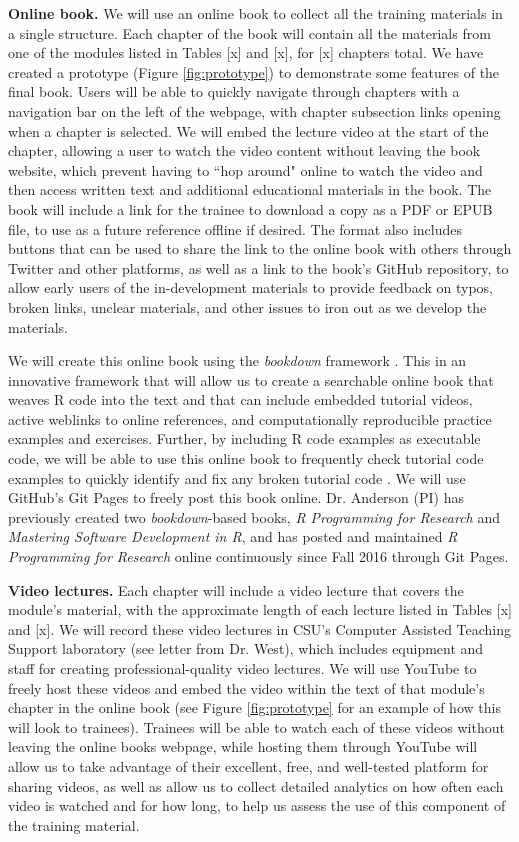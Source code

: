 \documentclass[pdftex,english,11pt,parskip=half]{scrartcl}
\begin{document}
\textbf{Online book.} We will use an online book to collect all the training materials in a single structure. Each chapter of the book will contain all the materials from one of the modules listed in Tables [x] and [x], for [x] chapters total. We have created a prototype (Figure \ref{fig:prototype}) to demonstrate some features of the final book. Users will be able to quickly navigate through chapters with a navigation bar on the left of the webpage, with chapter subsection links opening when a chapter is selected. We will embed the lecture video at the start of the chapter, allowing a user to watch the video content without leaving the book website, which prevent having to ``hop around" online to watch the video and then access written text and additional educational materials in the book. The book will include a link for the trainee to download a copy as a PDF or EPUB file, to use as a future reference offline if desired. The format also includes buttons that can be used to share the link to the online book with others through Twitter and other platforms, as well as a link to the book's GitHub repository, to allow early users of the in-development materials to provide feedback on typos, broken links, unclear materials, and other issues to iron out as we develop the materials. 

We will create this online book using the \textit{bookdown} framework \cite{xie2016bookdown}. This in an innovative framework that will allow us to create a searchable online book that weaves R code into the text and that can include embedded tutorial videos, active weblinks to online references, and computationally reproducible practice examples and exercises. Further, by including R code examples as executable code, we will be able to use this online book to frequently check tutorial code examples to quickly identify and fix any broken tutorial code \cite{xie2016bookdown}. We will use GitHub's Git Pages to freely post this book online. Dr. Anderson (PI) has previously created two \textit{bookdown}-based books, \textit{R Programming for Research} and \textit{Mastering Software Development in R}, and has posted and maintained \textit{R Programming for Research} online continuously since Fall 2016 through Git Pages.  

\textbf{Video lectures.} Each chapter will include a video lecture that covers the module's material, with the approximate length of each lecture listed in Tables [x] and [x]. We will record these video lectures in CSU's Computer Assisted Teaching Support laboratory (see letter from Dr. West), which includes equipment and staff for creating professional-quality video lectures. We will use YouTube to freely host these videos and embed the video within the text of that module's chapter in the online book (see Figure \ref{fig:prototype} for an example of how this will look to trainees). Trainees will be able to watch each of these videos without leaving the online books webpage, while hosting them through YouTube will allow us to take advantage of their excellent, free, and well-tested platform for sharing videos, as well as allow us to collect detailed analytics on how often each video is watched and for how long, to help us assess the use of this component of the training material. 
\end{document}
